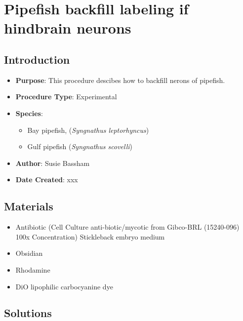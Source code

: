 \documentclass[
  letterpaper,
  DIV=11,
  numbers=noendperiod]{scrreprt}
\providecommand{\tightlist}{%
  \setlength{\itemsep}{0pt}\setlength{\parskip}{0pt}}\usepackage{longtable,booktabs,array}
\begin{document}
\hypertarget{sec-vert_exp-syngnathid_neuron}{%
\chapter{Pipefish backfill labeling if hindbrain
neurons}\label{sec-vert_exp-syngnathid_neuron}}

\hypertarget{introduction-85}{%
\section{Introduction}\label{introduction-85}}

\begin{itemize}
\tightlist
\item
  \textbf{Purpose}: This procedure descibes how to backfill nerons of
  pipefish.
\item
  \textbf{Procedure Type}: Experimental
\item
  \textbf{Species}:

  \begin{itemize}
  \tightlist
  \item
    Bay pipefish, (\emph{Syngnathus leptorhyncus})
  \item
    Gulf pipefish (\emph{Syngnathus scovelli})
  \end{itemize}
\item
  \textbf{Author}: Susie Bassham
\item
  \textbf{Date Created}: xxx
\end{itemize}

\hypertarget{materials-80}{%
\section{Materials}\label{materials-80}}

\begin{itemize}
\tightlist
\item
  Antibiotic (Cell Culture anti-biotic/mycotic from Gibco-BRL
  (15240-096) 100x Concentration) Stickleback embryo medium
\item
  Obsidian
\item
  Rhodamine
\item
  DiO lipophilic carbocyanine dye
\end{itemize}

\hypertarget{solutions-72}{%
\section{Solutions}\label{solutions-72}}
\end{document}
